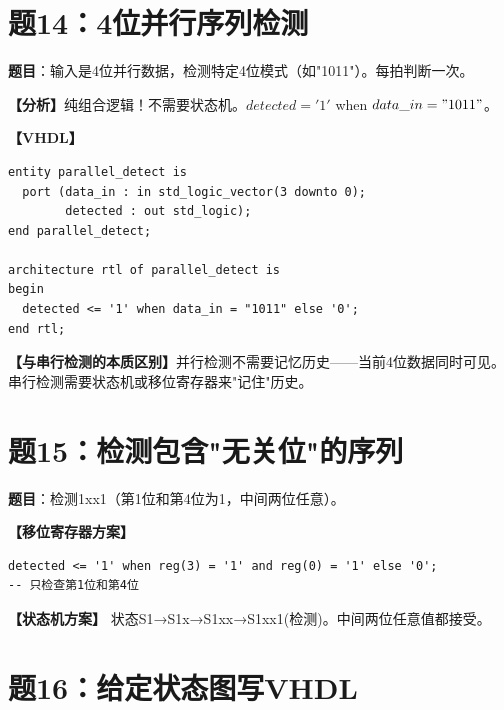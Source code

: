 \section{题14：4位并行序列检测}

\textbf{题目}：输入是4位并行数据，检测特定4位模式（如"1011"）。每拍判断一次。

\begin{solution}[完整解答]

\textbf{【分析】}纯组合逻辑！不需要状态机。$detected = '1'$ when $data\_in = "1011"$。

\textbf{【VHDL】}
\begin{lstlisting}
entity parallel_detect is
  port (data_in : in std_logic_vector(3 downto 0);
        detected : out std_logic);
end parallel_detect;

architecture rtl of parallel_detect is
begin
  detected <= '1' when data_in = "1011" else '0';
end rtl;
\end{lstlisting}

\textbf{【与串行检测的本质区别】}并行检测不需要记忆历史——当前4位数据同时可见。串行检测需要状态机或移位寄存器来"记住"历史。

\end{solution}


\section{题15：检测包含"无关位"的序列}

\textbf{题目}：检测1xx1（第1位和第4位为1，中间两位任意）。

\begin{solution}[完整解答]

\textbf{【移位寄存器方案】}
\begin{lstlisting}
detected <= '1' when reg(3) = '1' and reg(0) = '1' else '0';
-- 只检查第1位和第4位
\end{lstlisting}

\textbf{【状态机方案】}
状态S1→S1x→S1xx→S1xx1(检测)。中间两位任意值都接受。

\end{solution}


\section{题16：给定状态图写VHDL}

